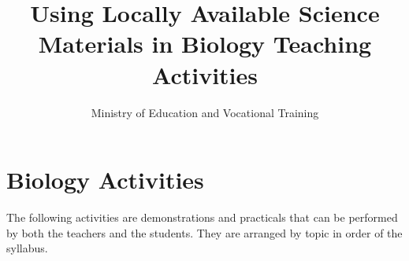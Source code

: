 \documentclass[12pt,a4paper]{report}
\author{Ministry of Education and Vocational Training}
\title{Using Locally Available Science Materials in Biology Teaching Activities}
\begin{document}




\tableofcontents







\chapter{Biology Activities}
The following activities are demonstrations and practicals that can be performed by both the teachers and the students. They are arranged by topic in order of the syllabus.









\end{document}
